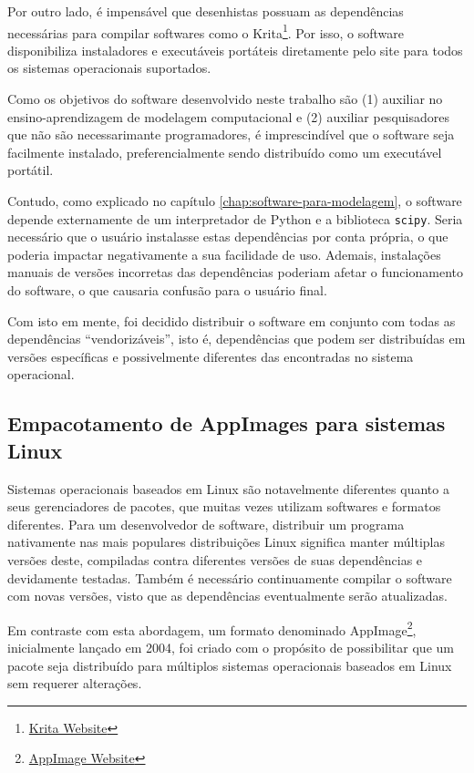 \documentclass[
	12pt,				%
	openright,			%
	oneside,			%
	a4paper,			%
	main=brazil,
	english,			%
	]{ufsj-abntex2}
\begin{document}
Por outro lado, é impensável que desenhistas possuam as dependências necessárias para compilar softwares como o Krita\footnote{\href{https://krita.org/en/}{Krita Website}}. Por isso, o software disponibiliza instaladores e executáveis portáteis diretamente pelo site para todos os sistemas operacionais suportados.

Como os objetivos do software desenvolvido neste trabalho são (1) auxiliar no ensino-aprendizagem de modelagem computacional e (2) auxiliar pesquisadores que não são necessarimante programadores, é imprescindível que o software seja facilmente instalado, preferencialmente sendo distribuído como um executável portátil.

Contudo, como explicado no capítulo \ref{chap:software-para-modelagem}, o software depende externamente de um interpretador de Python e a biblioteca \texttt{scipy}. Seria necessário que o usuário instalasse estas dependências por conta própria, o que poderia impactar negativamente a sua facilidade de uso. Ademais, instalações manuais de versões incorretas das dependências poderiam afetar o funcionamento do software, o que causaria confusão para o usuário final.

Com isto em mente, foi decidido distribuir o software em conjunto com todas as dependências ``vendorizáveis'', isto é, dependências que podem ser distribuídas em versões específicas e possivelmente diferentes das encontradas no sistema operacional.

\subsection{Empacotamento de AppImages para sistemas Linux}

Sistemas operacionais baseados em Linux são notavelmente diferentes quanto a seus gerenciadores de pacotes, que muitas vezes utilizam softwares e formatos diferentes. Para um desenvolvedor de software, distribuir um programa nativamente nas mais populares distribuições Linux significa manter múltiplas versões deste, compiladas contra diferentes versões de suas dependências e devidamente testadas. Também é necessário continuamente compilar o software com novas versões, visto que as dependências eventualmente serão atualizadas.

Em contraste com esta abordagem, um formato denominado AppImage\footnote{\href{https://appimage.org/}{AppImage Website}}, inicialmente lançado em 2004, foi criado com o propósito de possibilitar que um pacote seja distribuído para múltiplos sistemas operacionais baseados em Linux sem requerer alterações.
\end{document}
